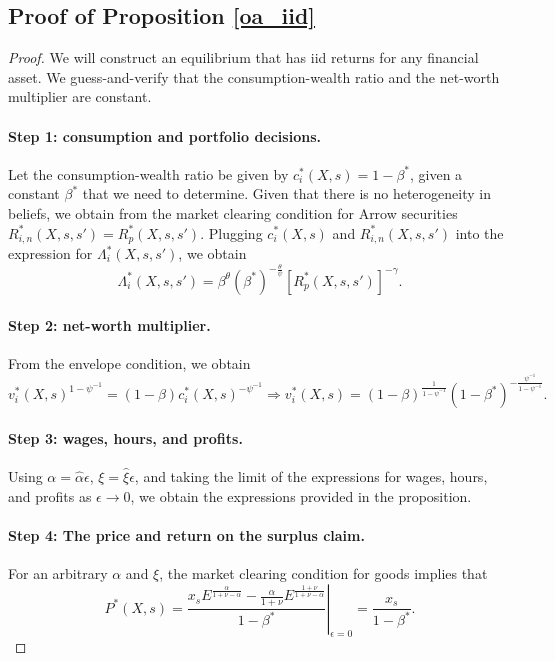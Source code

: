 \subsection{Proof of Proposition \ref{oa_iid}} \label{proof: oa_iid}
\begin{proof}
We will construct an equilibrium that has iid returns for any financial asset. We guess-and-verify that the consumption-wealth ratio and the net-worth multiplier are constant. 

\paragraph{Step 1: consumption and portfolio decisions.} Let the consumption-wealth ratio be given by $c_i^*(X,s) = 1-\beta^*$, given a constant $\beta^*$ that we need to determine. Given that there is no heterogeneity in beliefs, we obtain from the market clearing condition for Arrow securities $R_{i,n}^*(X,s,s') = R_p^*(X,s,s')$. Plugging $c_i^*(X,s)$ and $R_{i,n}^*(X,s,s')$ into the expression for $\Lambda_i^*(X,s,s')$, we obtain
\begin{equation}
    \Lambda_i^*(X,s,s') = \beta^\theta (\beta^*)^{-\frac{\theta}{\psi}} [R_{p}^*(X,s,s')]^{-\gamma}.
\end{equation}

\paragraph{Step 2: net-worth multiplier.} From the envelope condition, we obtain
\begin{equation}
    v_i^*(X,s)^{1-\psi^{-1}} = (1-\beta) c_i^*(X,s)^{-\psi^{-1}} \Rightarrow v_i^{*}(X,s) = (1-\beta)^{\frac{1}{1-\psi^{-1}}} (1-\beta^*)^{-\frac{\psi^{-1}}{1-\psi^{-1}}}.
\end{equation}

\paragraph{Step 3: wages, hours, and profits.} Using $\alpha = \hat{\alpha} \epsilon$, $\xi = \hat{\xi} \epsilon$, and taking the limit of the expressions for wages, hours, and profits as $\epsilon \rightarrow 0$, we obtain the expressions provided in the proposition.

\paragraph{Step 4: The price and return on the surplus claim.}
For an arbitrary $\alpha$ and $\xi$, the market clearing condition for goods implies that
\begin{equation}
    P^*(X,s) = \left.\frac{x_{s} E^\frac{\alpha}{1+\nu-\alpha} -\frac{ \alpha}{1+\nu} E^{\frac{1+\nu}{1+\nu-\alpha}}}{1-\beta^*}\right|_{\epsilon  = 0} = \frac{x_s}{1-\beta^*}.
\end{equation}


\end{proof}
